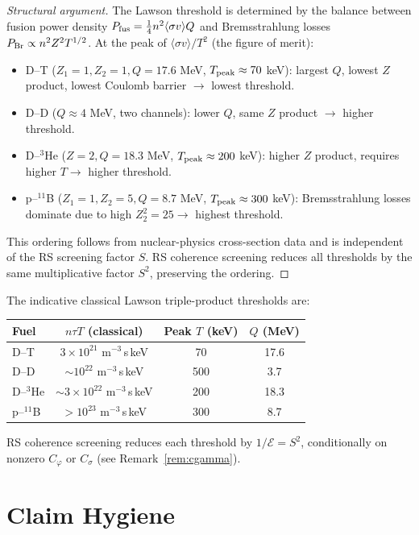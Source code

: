 \documentclass[12pt,a4paper]{article}
\theoremstyle{definition}
\theoremstyle{remark}
\begin{document}
\begin{proof}[Structural argument]
The Lawson threshold is determined by the balance between fusion
power density $P_{\rm fus} = \tfrac{1}{4} n^2 \langle\sigma v\rangle
Q$ and Bremsstrahlung losses $P_{\rm Br} \propto n^2 Z^2 T^{1/2}$.
At the peak of $\langle\sigma v\rangle/T^2$ (the figure of merit):
\begin{itemize}
  \item D--T ($Z_1=1, Z_2=1, Q=17.6$ MeV, $T_{\rm peak}\approx 70$ keV):
  largest $Q$, lowest $Z$ product, lowest Coulomb barrier $\to$
  lowest threshold.
  \item D--D ($Q\approx4$ MeV, two channels): lower $Q$, same $Z$
  product $\to$ higher threshold.
  \item D--${}^3$He ($Z=2, Q=18.3$ MeV, $T_{\rm peak}\approx 200$ keV):
  higher $Z$ product, requires higher $T \to$ higher threshold.
  \item p--${}^{11}$B ($Z_1=1, Z_2=5, Q=8.7$ MeV,
  $T_{\rm peak}\approx 300$ keV): Bremsstrahlung
  losses dominate due to high $Z_2^2 = 25 \to$ highest threshold.
\end{itemize}
This ordering follows from nuclear-physics cross-section data and
is independent of the RS screening factor $S$.  RS coherence
screening reduces all thresholds by the same multiplicative factor
$S^2$, preserving the ordering.
\end{proof}

\noindent The indicative classical Lawson triple-product thresholds
are:

\begin{center}
\begin{tabular}{@{}lccc@{}}
\toprule
\textbf{Fuel} & \textbf{$n\tau T$ (classical)} &
\textbf{Peak $T$ (keV)} & \textbf{$Q$ (MeV)} \\
\midrule
D--T & $3\times10^{21}$ m$^{-3}$\,s\,keV & 70 & 17.6 \\
D--D & $\sim10^{22}$ m$^{-3}$\,s\,keV & 500 & 3.7 \\
D--${}^3$He & $\sim3\times10^{22}$ m$^{-3}$\,s\,keV & 200 & 18.3 \\
p--${}^{11}$B & $>10^{23}$ m$^{-3}$\,s\,keV & 300 & 8.7 \\
\bottomrule
\end{tabular}
\end{center}
RS coherence screening reduces each threshold by $1/\mathcal{E} = S^2$,
conditionally on nonzero $C_\varphi$ or $C_\sigma$ (see
Remark~\ref{rem:cgamma}).

\section{Claim Hygiene}
\end{document}
